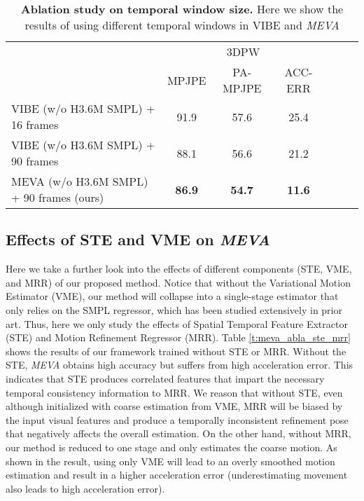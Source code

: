 \documentclass[runningheads]{llncs}
\begin{document}
\begin{table}[!thb]
\caption{\textbf{Ablation study on temporal window size.} Here we show the results of using different temporal windows in VIBE \cite{vibe} and \textit{MEVA} } \label{t:tp_abla} 
\centering
\resizebox{3 in}{!} {
\begin{tabular}{l|c|c|c|c|c|r}
\hline
\multicolumn{1}{c|}{\multirow{2}{*}{}} & \multicolumn{3}{c|}{3DPW } \\ \cline{2-4} 
\multicolumn{1}{c|}{} & MPJPE  & PA-MPJPE  &  ACC-ERR  \\ \hline
     VIBE (w/o H3.6M SMPL) + 16 frames \cite{vibe}  & 91.9 & 57.6 & 25.4  \\
     VIBE (w/o H3.6M SMPL) + 90 frames \cite{vibe}  & 88.1 & 56.6 & 21.2  \\
     MEVA (w/o H3.6M SMPL) + 90 frames (ours) & \textbf{86.9} & \textbf{54.7} & \textbf{11.6}  \\
     \hline
\end{tabular}}
\end{table}

\subsection{Effects of STE and VME on \textit{MEVA}}
Here we take a further look into the effects of different components (STE, VME, and MRR) of our proposed method. Notice that without the Variational Motion Estimator (VME), our method will collapse into a single-stage estimator that only relies on the SMPL regressor, which has been studied extensively in prior art. Thus, here we only study the effects of Spatial Temporal Feature Extractor (STE) and Motion Refinement Regressor (MRR). Table \ref{t:meva_abla_ste_mrr} shows the results of our framework trained without STE or MRR. Without the STE, \textit{MEVA} obtains high accuracy but suffers from high acceleration error. This indicates that STE produces correlated features that impart the necessary temporal consistency information to MRR. We reason that without STE, even although initialized with coarse estimation from VME, MRR will be biased by the input visual features and produce a temporally inconsistent refinement pose that negatively affects the overall estimation. On the other hand, without MRR, our method is reduced to one stage and only estimates the coarse motion.  As shown in the result, using only VME will lead to an overly smoothed motion estimation and result in a higher acceleration error (underestimating movement also leads to high acceleration error).
\end{document}
